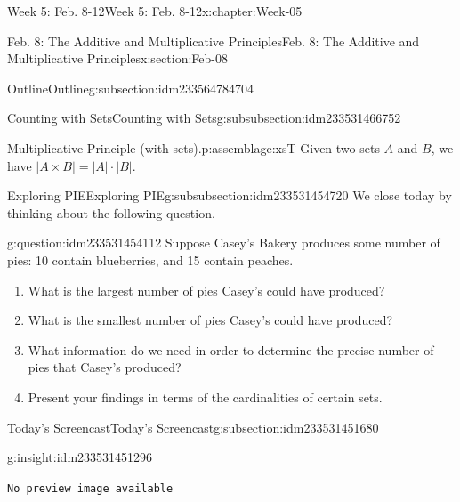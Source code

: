 \documentclass[oneside,10pt,]{book}
\newcommand{\mono}[1]{\texttt{#1}}
\numberwithin{equation}{section}
\newlength{\qrsize}
\newlength{\previewwidth}
\newcommand{\card}[1]{\left| #1 \right|}
\begin{document}
\begin{chapterptx}{Week 5: Feb. 8-12}{}{Week 5: Feb. 8-12}{}{}{x:chapter:Week-05}
\begin{sectionptx}{Feb. 8: The Additive and Multiplicative Principles}{}{Feb. 8: The Additive and Multiplicative Principles}{}{}{x:section:Feb-08}
\begin{subsectionptx}{Outline}{}{Outline}{}{}{g:subsection:idm233564784704}
\begin{subsubsectionptx}{Counting with Sets}{}{Counting with Sets}{}{}{g:subsubsection:idm233531466752}
\begin{assemblage}{Multiplicative Principle (with sets).}{p:assemblage:xsT}%
Given two sets \(A\) and \(B\), we have \(\card{A \times B} = \card{A} \cdot \card{B}\).%
\end{assemblage}
\end{subsubsectionptx}
%
%
\typeout{************************************************}
\typeout{************************************************}
%
\begin{subsubsectionptx}{Exploring PIE}{}{Exploring PIE}{}{}{g:subsubsection:idm233531454720}
We close today by thinking about the following question.%
\begin{question}{}{g:question:idm233531454112}%
Suppose Casey's Bakery produces some number of pies: 10 contain blueberries, and 15 contain peaches.%
%
\begin{enumerate}
\item{}What is the largest number of pies Casey's could have produced?%
\item{}What is the smallest number of pies Casey's could have produced?%
\item{}What information do we need in order to determine the precise number of pies that Casey's produced?%
\item{}Present your findings in terms of the cardinalities of certain sets.%
\end{enumerate}
\end{question}
\end{subsubsectionptx}
\end{subsectionptx}
%
%
\typeout{************************************************}
\typeout{************************************************}
%
\begin{subsectionptx}{Today's Screencast}{}{Today's Screencast}{}{}{g:subsection:idm233531451680}
\begin{insight}{}{g:insight:idm233531451296}%
\setlength{\qrsize}{9em}
\setlength{\previewwidth}{\linewidth}
\addtolength{\previewwidth}{-\qrsize}
\begin{tcbraster}[raster columns=2, raster column skip=1pt, raster halign=center, raster force size=false, raster left skip=0pt, raster right skip=0pt]%
\begin{tcolorbox}[previewstyle, width=\previewwidth]%
\mono{No preview image available}%
\end{tcolorbox}%
\begin{tcolorbox}[qrstyle]%

\end{tcolorbox}
\end{tcbraster}
\end{insight}
\end{subsectionptx}
\end{sectionptx}
\end{chapterptx}
\end{document}

